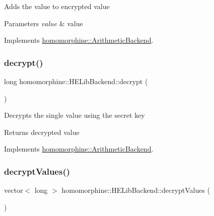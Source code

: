 Adds the value to encrypted value


\begin{DoxyParams}{Parameters}
{\em value} & value \\
\hline
\end{DoxyParams}


Implements \mbox{\hyperlink{classhomomorphine_1_1_arithmetic_backend_aa1c88ebc894527a72a9fdbd35ca14204}{homomorphine\+::\+Arithmetic\+Backend}}.

\mbox{\label{classhomomorphine_1_1_h_e_lib_backend_a2cd3ebc5a3332100e6cb24480262c395}} 
\subsubsection{\texorpdfstring{decrypt()}{decrypt()}}
{\footnotesize\ttfamily long homomorphine\+::\+H\+E\+Lib\+Backend\+::decrypt (\begin{DoxyParamCaption}{ }\end{DoxyParamCaption})\hspace{0.3cm}{\ttfamily [virtual]}}

Decrypts the single value using the secret key

\begin{DoxyReturn}{Returns}
decrypted value 
\end{DoxyReturn}


Implements \mbox{\hyperlink{classhomomorphine_1_1_arithmetic_backend_af4aad032c46ce51e608092ac206882bd}{homomorphine\+::\+Arithmetic\+Backend}}.

\mbox{\label{classhomomorphine_1_1_h_e_lib_backend_a650d87bee6056a404f8ab81ec0f84980}} 
\subsubsection{\texorpdfstring{decryptValues()}{decryptValues()}}
{\footnotesize\ttfamily vector$<$ long $>$ homomorphine\+::\+H\+E\+Lib\+Backend\+::decrypt\+Values (\begin{DoxyParamCaption}{ }\end{DoxyParamCaption})\hspace{0.3cm}{\ttfamily [virtual]}}

